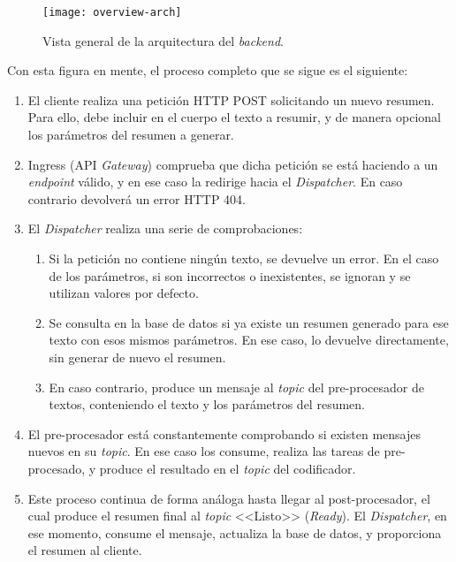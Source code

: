 \begin{figure}[!h]
	\centering
	\texttt{[image: overview-arch]}
	\caption{Vista general de la arquitectura del \emph{backend}.}
	\label{fig:overview-arch-2}
\end{figure}

Con esta figura en mente, el proceso completo que se sigue es el siguiente:

\begin{enumerate}
	\item El cliente realiza una petición HTTP POST solicitando un nuevo resumen. Para ello, debe incluir en el cuerpo el texto a resumir, y de manera opcional los parámetros del resumen a generar.
	
	\item Ingress (API \emph{Gateway}) comprueba que dicha petición se está haciendo a un \emph{endpoint} válido, y en ese caso la redirige hacia el \emph{Dispatcher}. En caso contrario devolverá un error HTTP 404.
	
	\item El \emph{Dispatcher} realiza una serie de comprobaciones:
	\begin{enumerate}
		\item Si la petición no contiene ningún texto, se devuelve un error. En el caso de los parámetros, si son incorrectos o inexistentes, se ignoran y se utilizan valores por defecto.
		
		\item Se consulta en la base de datos si ya existe un resumen generado para ese texto con esos mismos parámetros. En ese caso, lo devuelve directamente, sin generar de nuevo el resumen.
		
		\item En caso contrario, produce un mensaje al \emph{topic} del pre-procesador de textos, conteniendo el texto y los parámetros del resumen.
	\end{enumerate}

	\item El pre-procesador está constantemente comprobando si existen mensajes nuevos en su \emph{topic}. En ese caso los consume, realiza las tareas de pre-procesado, y produce el resultado en el \emph{topic} del codificador.
	
	\item Este proceso continua de forma análoga hasta llegar al post-procesador, el cual produce el resumen final al \emph{topic} <<Listo>> (\emph{Ready}). El \emph{Dispatcher}, en ese momento, consume el mensaje, actualiza la base de datos, y proporciona el resumen al cliente.
\end{enumerate}

